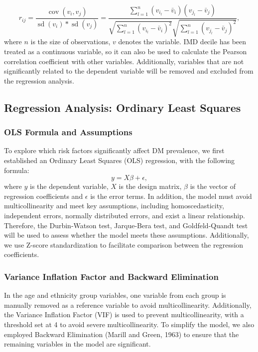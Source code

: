 \begin{equation}
r_{i j}=\frac{\operatorname{cov}\left(v_i, v_j\right)}{\operatorname{sd}\left(v_i\right) * \operatorname{sd}\left(v_j\right)}=\frac{\sum_{l=1}^n\left(v_{i_l}-\bar{v}_i\right)\left(v_{j_l}-\bar{v}_j\right)}{\sqrt{\sum_{l=1}^n\left(v_{i_l}-\bar{v}_i\right)^2} \sqrt{\sum_{l=1}^n\left(v_{j_l}-\bar{v}_j\right)^2}},
\end{equation}
where $n$ is the size of observations, $v$ denotes the variable. IMD decile has been treated as a continuous variable, so it can also be used to calculate the Pearson correlation coefficient with other variables. Additionally, variables that are not significantly related to the dependent variable will be removed and excluded from the regression analysis.


\subsection{Regression Analysis: Ordinary Least Squares}
\label{sec:3.4.3}
\subsubsection{OLS Formula and Assumptions}
\label{sec:3.4.3.1}
To explore which risk factors significantly affect DM prevalence, we first established an Ordinary Least Squares (OLS) regression, with the following formula:
\begin{equation}
y=X \beta+\epsilon,
\end{equation}
where $y$ is the dependent variable, $X$ is the design matrix, $\beta$ is the vector of regression coefficients and $\epsilon$ is the error terms. In addition, the model must avoid multicollinearity and meet key assumptions, including homoscedasticity, independent errors, normally distributed errors, and exist a linear relationship. Therefore, the Durbin-Watson test, Jarque-Bera test, and Goldfeld-Quandt test will be used to assess whether the model meets these assumptions. Additionally, we use Z-score standardization to facilitate comparison between the regression coefficients.
\subsubsection{Variance Inflation Factor and Backward Elimination}
\label{sec:3.4.3.2}
In the age and ethnicity group variables, one variable from each group is manually removed as a reference variable to avoid multicollinearity. Additionally, the Variance Inflation Factor (VIF) is used to prevent multicollinearity, with a threshold set at 4 to avoid severe multicollinearity. To simplify the model, we also employed Backward Elimination (Marill and Green, 1963) to ensure that the remaining variables in the model are significant.
